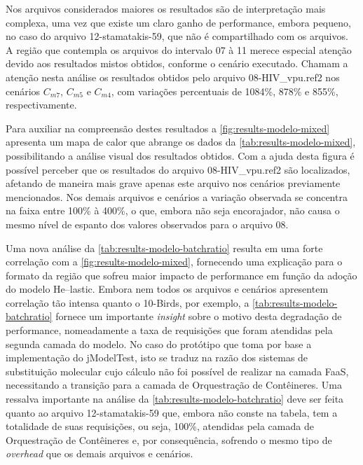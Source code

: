 \documentclass[english,brazilian]{UNISINOSmonografia} %
\begin{document}
Nos arquivos considerados maiores os resultados são de interpretação mais complexa, uma vez que existe um claro ganho de performance, embora pequeno, no caso do arquivo 12-stamatakis-59, que não é compartilhado com os arquivos.
%
A região que contempla os arquivos do intervalo 07 à 11 merece especial atenção devido aos resultados mistos obtidos, conforme o cenário executado.
%
Chamam a atenção nesta análise os resultados obtidos pelo arquivo 08-HIV\_vpu.ref2 nos cenários $C_{m7}$, $C_{m5}$ e $C_{m4}$, com variações percentuais de 1084\%, 878\% e 855\%, respectivamente.


Para auxiliar na compreensão destes resultados a \autoref{fig:results-modelo-mixed} apresenta um mapa de calor que abrange os dados da \autoref{tab:results-modelo-mixed}, possibilitando a análise visual dos resultados obtidos.
%
Com a ajuda desta figura é possível perceber que os resultados do arquivo 08-HIV\_vpu.ref2 são localizados, afetando de maneira mais grave apenas este arquivo nos cenários previamente mencionados.
%
Nos demais arquivos e cenários a variação observada se concentra na faixa entre 100\% à 400\%, o que, embora não seja encorajador, não causa o mesmo nível de espanto dos valores observados para o arquivo 08.


Uma nova análise da \autoref{tab:results-modelo-batchratio} resulta em uma forte correlação com a \autoref{fig:results-modelo-mixed}, fornecendo uma explicação para o formato da região que sofreu maior impacto de performance em função da adoção do modelo \textsf{He}--lastic.
%
Embora nem todos os arquivos e cenários apresentem correlação tão intensa quanto o 10-Birds, por exemplo, a \autoref{tab:results-modelo-batchratio} fornece um importante \textit{insight} sobre o motivo desta degradação de performance, nomeadamente a taxa de requisições que foram atendidas pela segunda camada do modelo.
%
No caso do protótipo que toma por base a implementação do jModelTest, isto se traduz na razão dos sistemas de substituição molecular cujo cálculo não foi possível de realizar na camada FaaS, necessitando a transição para a camada de Orquestração de Contêineres.
%
Uma ressalva importante na análise da \autoref{tab:results-modelo-batchratio} deve ser feita quanto ao arquivo 12-stamatakis-59 que, embora não conste na tabela, tem a totalidade de suas requisições, ou seja, 100\%, atendidas pela camada de Orquestração de Contêineres e, por consequência, sofrendo o mesmo tipo de \textit{overhead} que os demais arquivos e cenários.
\end{document}
